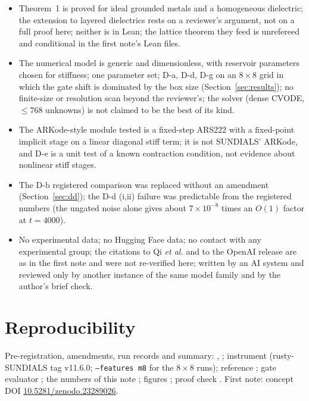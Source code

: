 \documentclass[11pt,a4paper]{article}
\begin{document}
\begin{itemize}[nosep]
\item Theorem~1 is proved for ideal grounded metals and a homogeneous dielectric; the extension to layered dielectrics rests on a
reviewer's argument, not on a full proof here; neither is in Lean; the lattice theorem they feed is unrefereed and conditional in the
first note's Lean files.
\item The numerical model is generic and dimensionless, with reservoir parameters chosen for stiffness; one parameter set; D-a, D-d,
D-g on an $8\times8$ grid in which the gate shift is dominated by the box size (Section~\ref{sec:results}); no finite-size or
resolution scan beyond the reviewer's; the solver (dense CVODE, $\leq768$ unknowns) is not claimed to be the best of its kind.
\item The ARKode-style module tested is a fixed-step ARS222 with a fixed-point implicit stage on a linear diagonal stiff term; it is
not SUNDIALS' ARKode, and D-e is a unit test of a known contraction condition, not evidence about nonlinear stiff stages.
\item The D-b registered comparison was replaced without an amendment (Section~\ref{sec:dd}); the D-d (i,ii) failure was predictable
from the registered numbers (the ungated noise alone gives about $7\times10^{-8}$ times an $O(1)$ factor at $t=4000$).
\item No experimental data; no Hugging Face data; no contact with any experimental group; the citations to Qi \emph{et al.} and to
the OpenAI release are as in the first note and were not re-verified here; written by an AI system and reviewed only by another
instance of the same model family and by the author's brief check.
\end{itemize}

\section*{Reproducibility}
Pre-registration, amendments, run records and summary: ,
; instrument  (rusty-SUNDIALS
tag v11.6.0; \texttt{--features m8} for the $8\times8$ runs); reference ; gate evaluator
; the numbers of this note ; figures ; proof check
. First note: concept DOI \href{https://doi.org/10.5281/zenodo.23289026}{10.5281/zenodo.23289026}.
\end{document}
